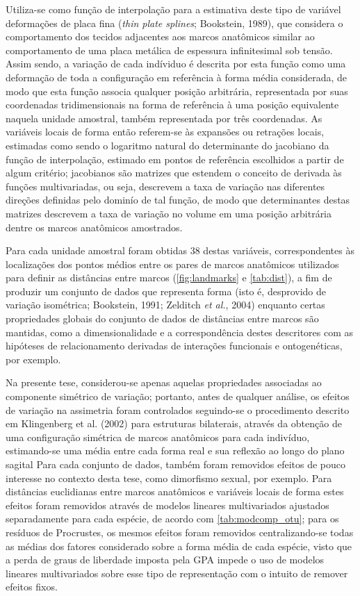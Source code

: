 \documentclass[12pt,twoside]{report}
\begin{document}
Utiliza-se como função de interpolação para a estimativa deste tipo de
variável deformações de placa fina (\emph{thin plate splines};
Bookstein, 1989), que considera o comportamento dos tecidos adjacentes
aos marcos anatômicos similar ao comportamento de uma placa metálica de
espessura infinitesimal sob tensão. Assim sendo, a variação de cada
indíviduo é descrita por esta função como uma deformação de toda a
configuração em referência à forma média considerada, de modo que esta
função associa qualquer posição arbitrária, representada por suas
coordenadas tridimensionais na forma de referência à uma posição
equivalente naquela unidade amostral, também representada por três
coordenadas. As variáveis locais de forma então referem-se às expansões
ou retrações locais, estimadas como sendo o logaritmo natural do
determinante do jacobiano da função de interpolação, estimado em pontos
de referência escolhidos a partir de algum critério; jacobianos são
matrizes que estendem o conceito de derivada às funções multivariadas,
ou seja, descrevem a taxa de variação nas diferentes direções definidas
pelo dominío de tal função, de modo que determinantes destas matrizes
descrevem a taxa de variação no volume em uma posição arbitrária dentre
os marcos anatômicos amostrados.

Para cada unidade amostral foram obtidas 38 destas variáveis,
correspondentes às localizações dos pontos médios entre os pares de
marcos anatômicos utilizados para definir as distâncias entre marcos
(\autoref{fig:landmarks} e \autoref{tab:dist}), a fim de produzir um
conjunto de dados que representa forma (isto é, desprovido de variação
isométrica; Bookstein, 1991; Zelditch \emph{et al.}, 2004) enquanto
certas propriedades globais do conjunto de dados de distâncias entre
marcos são mantidas, como a dimensionalidade e a correspondência destes
descritores com as hipóteses de relacionamento derivadas de interações
funcionais e ontogenéticas, por exemplo.

Na presente tese, considerou-se apenas aquelas propriedades associadas
ao componente simétrico de variação; portanto, antes de qualquer
análise, os efeitos de variação na assimetria foram controlados
seguindo-se o procedimento descrito em Klingenberg et al. (2002) para
estruturas bilaterais, através da obtenção de uma configuração simétrica
de marcos anatômicos para cada indivíduo, estimando-se uma média entre
cada forma real e sua reflexão ao longo do plano sagital Para cada
conjunto de dados, também foram removidos efeitos de pouco interesse no
contexto desta tese, como dimorfismo sexual, por exemplo. Para
distâncias euclidianas entre marcos anatômicos e variáveis locais de
forma estes efeitos foram removidos através de modelos lineares
multivariados ajustados separadamente para cada espécie, de acordo com
\autoref{tab:modcomp_otu}; para os resíduos de Procrustes, os mesmos
efeitos foram removidos centralizando-se todas as médias dos fatores
considerado sobre a forma média de cada espécie, visto que a perda de
graus de liberdade imposta pela GPA impede o uso de modelos lineares
multivariados sobre esse tipo de representação com o intuito de remover
efeitos fixos.
\end{document}
